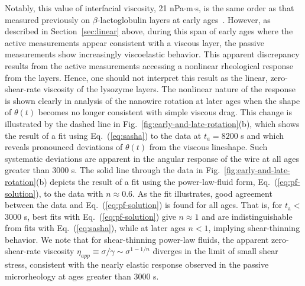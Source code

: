 Notably, this value of interfacial viscosity, 21 nPa$\cdot$m$\cdot$s, is the same order as that measured previously on $\beta$-lactoglobulin layers at early ages~\cite{Lee2010}.  However, as described in Section~\ref{sec:linear} above, during this span of early ages where the active measurements appear consistent with a viscous layer, the passive measurements show increasingly viscoelastic behavior.  This apparent discrepancy results from the active measurements accessing a nonlinear rheological response from the layers.  Hence, one should not interpret this result as the linear, zero-shear-rate viscosity of the lysozyme layers.  The nonlinear nature of the response is shown clearly in analysis of the nanowire rotation at later ages when the shape of $\theta(t)$ becomes no longer consistent with simple viscous drag.  This change is illustrated by the dashed line in Fig.~\ref{fig:early-and-late-rotation}(b), which shows the result of a fit using Eq.~(\ref{eq:sasha}) to the data at $t_a = 8200$ s and which reveals pronounced deviations of $\theta(t)$ from the viscous lineshape.  Such systematic deviations are apparent in the angular response of the wire at all ages greater than 3000 s.  The solid line through the data in Fig.~\ref{fig:early-and-late-rotation}(b) depicts the result of a fit using the power-law-fluid form, Eq.~(\ref{eq:pf-solution}), to the data with $n \approx 0.6$.  As the fit illustrates, good agreement between the data and Eq.~(\ref{eq:pf-solution}) is found for all ages.  That is, for $t_{\text{a}} < $ 3000 s, best fits with Eq.~(\ref{eq:pf-solution}) give $n \approx 1$ and are indistinguishable from fits with Eq.~(\ref{eq:sasha}), while at later ages $n < 1$, implying shear-thinning behavior.  We note that for shear-thinning power-law fluids, the apparent zero-shear-rate viscosity $\eta_{app}\equiv \sigma/\dot{\gamma} \sim \sigma^{1-1/n}$ diverges in the limit of small shear stress, consistent with the nearly elastic response observed in the passive microrheology at ages greater than 3000 s.


